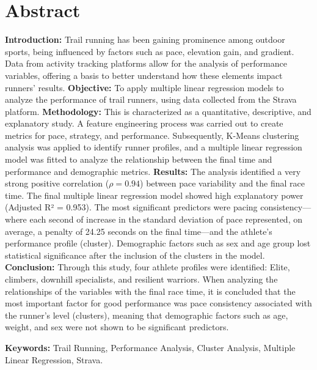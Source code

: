 \chapter*{Abstract}
\thispagestyle{empty}
\label{chap:abstract}

\textbf{Introduction:} Trail running has been gaining prominence among outdoor sports, being influenced by factors such as pace, elevation gain, and gradient. Data from activity tracking platforms allow for the analysis of performance variables, offering a basis to better understand how these elements impact runners' results.
\textbf{Objective:} To apply multiple linear regression models to analyze the performance of trail runners, using data collected from the Strava platform.
\textbf{Methodology:} This is characterized as a quantitative, descriptive, and explanatory study. A feature engineering process was carried out to create metrics for pace, strategy, and performance. Subsequently, K-Means clustering analysis was applied to identify runner profiles, and a multiple linear regression model was fitted to analyze the relationship between the final time and performance and demographic metrics.
\textbf{Results:} The analysis identified a very strong positive correlation ($\rho = 0.94$) between pace variability and the final race time. The final multiple linear regression model showed high explanatory power (Adjusted R² = 0.953). The most significant predictors were pacing consistency—where each second of increase in the standard deviation of pace represented, on average, a penalty of 24.25 seconds on the final time—and the athlete's performance profile (cluster). Demographic factors such as sex and age group lost statistical significance after the inclusion of the clusters in the model.
\textbf{Conclusion:} Through this study, four athlete profiles were identified: Elite, climbers, downhill specialists, and resilient warriors. When analyzing the relationships of the variables with the final race time, it is concluded that the most important factor for good performance was pace consistency associated with the runner's level (clusters), meaning that demographic factors such as age, weight, and sex were not shown to be significant predictors. 

\vspace{0.5\baselineskip}
\textbf{Keywords:} Trail Running, Performance Analysis, Cluster Analysis, Multiple Linear Regression, Strava.
